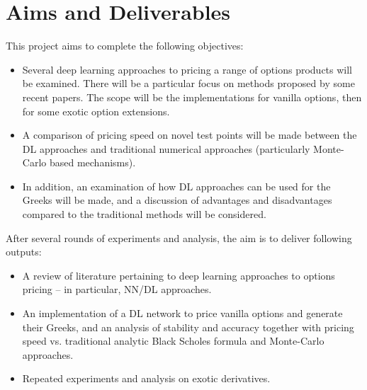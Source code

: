 \documentclass{report}
\begin{document}
\section{Aims and Deliverables}
This project aims to complete the following objectives:
\begin{itemize}
\item Several deep learning approaches to pricing a range of options products will be examined. There will be a particular focus on methods proposed by some recent papers. The scope will be the implementations for vanilla options, then for some exotic option extensions.
\item A comparison of pricing speed on novel test points will be made between the DL approaches and traditional numerical approaches (particularly Monte-Carlo based mechanisms).
\item In addition, an examination of how DL approaches can be used for the Greeks will be made, and a discussion of advantages and disadvantages compared to the traditional methods will be considered.
\end{itemize}
After several rounds of experiments and analysis, the aim is to deliver following outputs:
\begin{itemize}
\item A review of literature pertaining to deep learning approaches to options pricing – in particular, NN/DL approaches.
\item An implementation of a DL network to price vanilla options and generate their Greeks, and an analysis of  stability and accuracy together with pricing speed vs. traditional analytic Black Scholes formula and Monte-Carlo approaches.
\item Repeated experiments and analysis on exotic derivatives.
\end{itemize}
\end{document}
